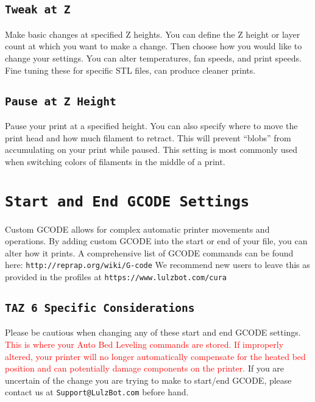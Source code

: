 \subsection{\texttt{Tweak at Z}}
Make basic changes at specified Z heights. You can define the Z height or layer count at which you want to make a change. Then choose how you would like to change your settings. You can alter temperatures, fan speeds, and print speeds. Fine tuning these for specific STL files, can produce cleaner prints.

\subsection{\texttt{Pause at Z Height}}
Pause your print at a specified height. You can also specify where to move the print head and how much filament to retract. This will prevent “blobs” from accumulating on your print while paused. This setting is most commonly used when switching colors of filaments in the middle of a print.

\section{\texttt{Start and End GCODE Settings}}
Custom GCODE allows for complex automatic printer movements and operations. By adding custom GCODE into the start or end of your file, you can alter how it prints. A comprehensive list of GCODE commands can be found here: \texttt{http://reprap.org/wiki/G-code} We recommend new users to leave this as provided in the profiles at \texttt{https://www.lulzbot.com/cura}

\subsection{\texttt{TAZ 6 Specific Considerations}}
Please be cautious when changing any of these start and end GCODE settings. \textcolor{red}{This is where your Auto Bed Leveling commands are stored. If improperly altered, your printer will no longer automatically compensate for the heated bed position and can potentially damage components on the printer.} If you are uncertain of the change you are trying to make to start/end GCODE, please contact us at \texttt{Support@LulzBot.com} before hand.


